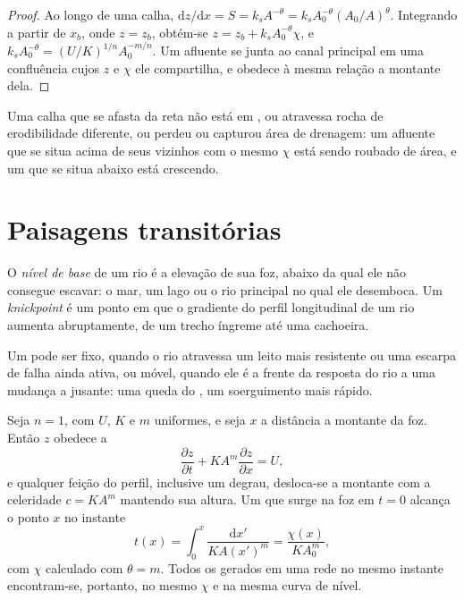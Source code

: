 \begin{proof}
Ao longo de uma calha, $\mathrm{d}z/\mathrm{d}x = S = k_s A^{-\theta} = k_s
A_0^{-\theta}(A_0/A)^{\theta}$. Integrando a partir de $x_b$, onde $z = z_b$,
obtém-se $z = z_b + k_s A_0^{-\theta}\chi$, e $k_s A_0^{-\theta} =
(U/K)^{1/n} A_0^{-m/n}$. Um afluente se junta ao canal principal em uma confluência
cujos $z$ e $\chi$ ele compartilha, e obedece à mesma relação a montante dela.
\end{proof}

Uma calha que se afasta da reta não está em , ou atravessa
rocha de erodibilidade diferente, ou perdeu ou capturou área de drenagem: um
afluente que se situa acima de seus vizinhos com o mesmo $\chi$ está sendo
roubado de área, e um que se situa abaixo está crescendo.

\section{Paisagens transitórias}\label{sec:b3:quantitative-geomorphology:transient}

\begin{definition}\label{def:b3:quantitative-geomorphology:knickpoint}
O \emph{nível de base} de um rio é a elevação de sua foz,
abaixo da qual ele não consegue escavar: o mar, um lago ou o rio principal
no qual ele desemboca. Um \emph{knickpoint} é um ponto em que o
gradiente do perfil longitudinal de um rio aumenta abruptamente, de um trecho
íngreme até uma cachoeira.
\end{definition}

Um  pode ser fixo, quando o rio atravessa um leito mais resistente ou
uma escarpa de falha ainda ativa, ou móvel, quando ele é a frente da
resposta do rio a uma mudança a jusante: uma queda do , um
soerguimento mais rápido.

\begin{theorem}\label{thm:b3:quantitative-geomorphology:kinematic}
Seja $n = 1$, com $U$, $K$ e $m$ uniformes, e seja $x$ a distância
a montante da foz. Então $z$ obedece a
\[
\frac{\partial z}{\partial t} + K A^m \frac{\partial z}{\partial x} = U ,
\]
e qualquer feição do perfil, inclusive um degrau, desloca-se a montante com a
celeridade $c = K A^m$ mantendo sua altura. Um  que surge na foz em
$t = 0$ alcança o ponto $x$ no instante
\[
t(x) = \int_0^x \frac{\mathrm{d}x'}{K A(x')^m} = \frac{\chi(x)}{K A_0^m},
\]
com $\chi$ calculado com $\theta = m$. Todos os  gerados em uma rede
no mesmo instante encontram-se, portanto, no mesmo $\chi$ e na mesma curva de nível.
\end{theorem}

